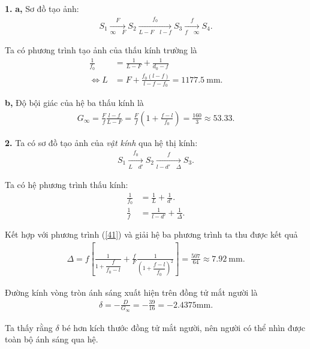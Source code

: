 \textbf{1.} \textbf{a,} Sơ đồ tạo ảnh:
\begin{align}
     S_1 \xrightarrow[\displaystyle \infty \quad F]{\displaystyle F} S_2 \xrightarrow[\displaystyle L -F \quad l- f]{\displaystyle f_0} S_3 \xrightarrow[\displaystyle  f \quad \infty]{\displaystyle f} S_4.
\end{align}


Ta có phương trình tạo ảnh của thấu kính trường là
\begin{align}
\frac{1}{f_0} &= \frac{1}{L - F} + \frac{1}{d_0 - f}\\
\Leftrightarrow L &= F + \frac{f_0 (l - f)}{l - f - f_0} = 1177.5 \mathrm{~mm}.\label{41}
\end{align}

\textbf{b,} Độ bội giác của hệ ba thấu kính là
\begin{align}
    G_\infty = \frac{F}{f} \frac{l - f}{L - F} = \frac{F}{f} \left( 1 + \frac{f-l}{f_0} \right)  = \frac{160}{3} \approx 53.33.
\end{align}

\textbf{2.} Ta có sơ đồ tạo ảnh của \textit{vật kính} qua hệ thị kính:
\begin{align}
     S_1 \xrightarrow[\displaystyle L \quad d']{\displaystyle f_0} S_2 \xrightarrow[\displaystyle l - d' \quad \Delta]{\displaystyle  f} S_3.
\end{align}

Ta có hệ phương trình thấu kính:
\begin{align}
    \frac{1}{f_0} &= \frac{1}{L} + \frac{1}{d'}.\\
    \frac{1}{f} &= \frac{1}{l - d'} + \frac{1}{\Delta}.
\end{align}

Kết hợp với phương trình (\ref{41}) và giải hệ ba phương trình ta thu được kết quả
\begin{align}
    \Delta = f \left[\frac{1}{1 + \dfrac{f}{f_0 - l}} + \frac{f}{F} \frac{1}{\left(1 + \dfrac{f-l}{f_0} \right)^2} \right] =\frac{507}{64} \approx 7.92 \mathrm{~mm}.
\end{align}

Đường kính vòng tròn ánh sáng xuất hiện trên đồng tử mắt người là
\begin{align}
    \delta = -\frac{D}{G_\infty} = -\frac{39}{16} = -2.4375 \mathrm{mm}.
\end{align}

Ta thấy rằng $\delta$ bé hơn kích thước đồng tử mắt người, nên người có thể nhìn được toàn bộ ánh sáng qua hệ.

